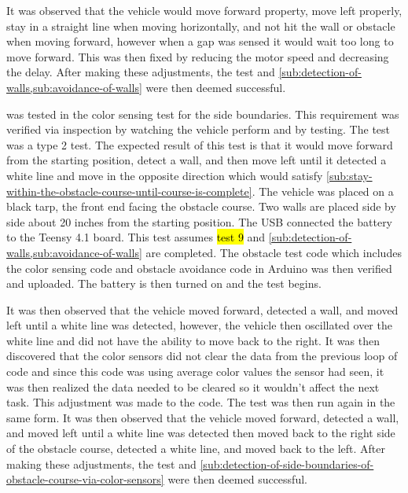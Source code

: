 \documentclass[11pt]{report}
\begin{document}
It was observed that the vehicle would move forward property, move left properly, stay in a straight line when moving horizontally, and not hit the wall or obstacle when moving forward, however when a gap was sensed it would wait too long to move forward. This was then fixed by reducing the motor speed and decreasing the delay. After making these adjustments, the test and \cref{sub:detection-of-walls,sub:avoidance-of-walls} were then deemed successful.

\label{tst:color-sensing-for-side-boundaries}
 was tested in the color sensing test for the side boundaries. This requirement was verified via inspection by watching the vehicle perform and by testing. The test was a type 2 test. The expected result of this test is that it would move forward from the starting position, detect a wall, and then move left until it detected a white line and move in the opposite direction which would satisfy \cref{sub:stay-within-the-obstacle-course-until-course-is-complete}. The vehicle was placed on a black tarp, the front end facing the obstacle course. Two walls are placed side by side about 20 inches from the starting position. The USB connected the battery to the Teensy 4.1 board. This test assumes \hl{test 9} and \cref{sub:detection-of-walls,sub:avoidance-of-walls} are completed. The obstacle test code which includes the color sensing code and obstacle avoidance code in Arduino was then verified and uploaded. The battery is then turned on and the test begins.

It was then observed that the vehicle moved forward, detected a wall, and moved left until a white line was detected, however, the vehicle then oscillated over the white line and did not have the ability to move back to the right. It was then discovered that the color sensors did not clear the data from the previous loop of code and since this code was using average color values the sensor had seen, it was then realized the data needed to be cleared so it wouldn’t affect the next task. This adjustment was made to the code. The test was then run again in the same form. It was then observed that the vehicle moved forward, detected a wall, and moved left until a white line was detected then moved back to the right side of the obstacle course, detected a white line, and moved back to the left. After making these adjustments, the test and \cref{sub:detection-of-side-boundaries-of-obstacle-course-via-color-sensors} were then deemed successful.
\end{document}
